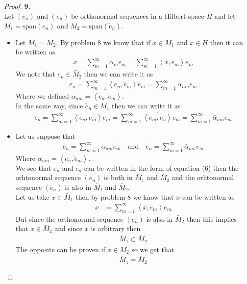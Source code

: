 \documentclass[11pt]{article}
\newcommand{\inprd}[1]{\left\langle{#1}\right\rangle}
\theoremstyle{definition}
\begin{document}
\cleardoublepage
\begin{proof}{\textbf{9.}}\\
Let $(e_n)$ and $(\tilde{e}_n)$ be orthonormal sequences in a Hilbert space $H$
and let $M_1 = \text{span}(e_n)$ and $M_2 = \text{span}(\tilde{e}_n)$.
\begin{itemize}
\item [($\Rightarrow$)] Let $\bar{M}_1 = \bar{M}_2$. By problem 8 we know
that if $x \in \bar{M}_1$ and $x \in H$ then it can be written as
\begin{align*}
    x = \sum_{m=1}^\infty \alpha_m e_{m} = \sum_{m=1}^\infty \inprd{x, e_m} e_{m}
\end{align*}
We note that $e_n \in \bar{M}_2$ then we can write it as
\begin{align*}
    e_n = \sum_{m=1}^\infty \inprd{e_n, \tilde{e}_{m}} \tilde{e}_{m}
    = \sum_{m=1}^\infty \alpha_{nm} \tilde{e}_{m}
\end{align*}
Where we defined $\alpha_{nm} = \inprd{e_n, \tilde{e}_{m}}$.\\
In the same way, since $\tilde{e}_n \in M_1$ then we can write it as
\begin{align*}
    \tilde{e}_n = \sum_{m=1}^\infty \inprd{\tilde{e}_n, e_{m}} e_{m}
    = \sum_{m=1}^\infty \overline{\inprd{e_{m}, \tilde{e}_n}} e_{m}
    = \sum_{m=1}^\infty \bar{\alpha}_{mn} e_{m}
\end{align*}
\item [($\Leftarrow$)] Let us suppose that
\begin{align*}
    e_n = \sum_{m=1}^\infty \alpha_{nm} \tilde{e}_{m}
    \quad\text{and}\quad
    \tilde{e}_n = \sum_{m=1}^\infty \bar{\alpha}_{mn} e_{m}
\end{align*}
Where $\alpha_{nm} = \inprd{e_n, \tilde{e}_{m}}$.\\
We see that $e_n$ and $\tilde{e}_n$ can be written in the form of equation (6)
then the orhtonormal sequence $(e_n)$ is both in $\bar{M}_1$ and $\bar{M}_2$
and the orhtonormal sequence $(\tilde{e}_n)$ is also in $\bar{M}_1$ and
$\bar{M}_2$.\\
Let us take $x \in \bar{M}_1$ then by problem 8 we know that $x$ can be written
as
\begin{align*}
    x &= \sum_{m=1}^\infty \inprd{x, e_m} e_{m}
\end{align*}
But since the orthonormal sequence $(e_n)$ is also in $\bar{M}_2$ then this
implies that $x \in \bar{M}_2$ and since $x$ is arbitrary then 
\begin{align*}
   \bar{M}_1 \subset \bar{M}_2
\end{align*}
The opposite can be proven if $x \in \bar{M}_2$ so we get that
\begin{align*}
   \bar{M}_1 = \bar{M}_2
\end{align*}
\end{itemize}
\end{proof}
\end{document}
